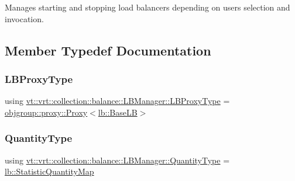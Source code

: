 Manages starting and stopping load balancers depending on user\textquotesingle{}s selection and invocation. 

\subsection{Member Typedef Documentation}
\mbox{\label{structvt_1_1vrt_1_1collection_1_1balance_1_1_l_b_manager_a8b1a7735366beb85c2c2ccc3912cdd80}} 
\subsubsection{\texorpdfstring{L\+B\+Proxy\+Type}{LBProxyType}}
{\footnotesize\ttfamily using \hyperlink{structvt_1_1vrt_1_1collection_1_1balance_1_1_l_b_manager_a8b1a7735366beb85c2c2ccc3912cdd80}{vt\+::vrt\+::collection\+::balance\+::\+L\+B\+Manager\+::\+L\+B\+Proxy\+Type} =  \hyperlink{structvt_1_1objgroup_1_1proxy_1_1_proxy}{objgroup\+::proxy\+::\+Proxy}$<$\hyperlink{structvt_1_1vrt_1_1collection_1_1lb_1_1_base_l_b}{lb\+::\+Base\+LB}$>$}

\mbox{\label{structvt_1_1vrt_1_1collection_1_1balance_1_1_l_b_manager_ab76adf3f0da19ba30d9f95bb882bda65}} 
\subsubsection{\texorpdfstring{Quantity\+Type}{QuantityType}}
{\footnotesize\ttfamily using \hyperlink{structvt_1_1vrt_1_1collection_1_1balance_1_1_l_b_manager_ab76adf3f0da19ba30d9f95bb882bda65}{vt\+::vrt\+::collection\+::balance\+::\+L\+B\+Manager\+::\+Quantity\+Type} =  \hyperlink{namespacevt_1_1vrt_1_1collection_1_1lb_aa3a389ff9262dd6be27791dcf037ef38}{lb\+::\+Statistic\+Quantity\+Map}}

